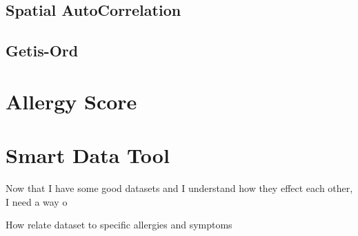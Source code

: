 \subsection{Spatial AutoCorrelation}
\subsection{Getis-Ord}


\section{Allergy Score}

\section{Smart Data Tool}

Now that I have some good datasets and I understand how they effect each other, I need a way o

How relate dataset to specific allergies and symptoms